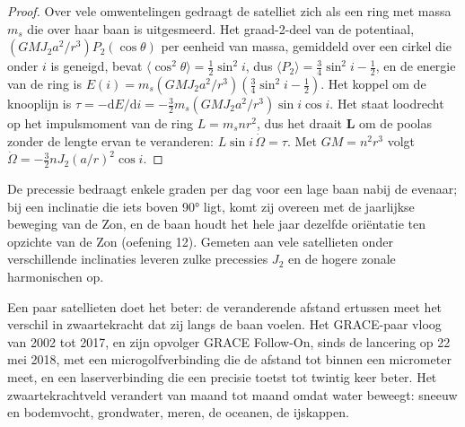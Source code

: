 \begin{proof}
Over vele omwentelingen gedraagt de satelliet zich als een ring met massa $m_s$ die
over haar baan is uitgesmeerd. Het graad-2-deel van de potentiaal,
$(GMJ_2a^2/r^3)P_2(\cos\theta)$ per eenheid van massa, gemiddeld over een cirkel die
onder $i$ is geneigd, bevat $\langle\cos^2\theta\rangle = \tfrac12\sin^2i$, dus
$\langle P_2\rangle = \tfrac34\sin^2i - \tfrac12$, en de energie van de ring is
$E(i) = m_s(GMJ_2a^2/r^3)(\tfrac34\sin^2i - \tfrac12)$. Het koppel om de knooplijn
is $\tau = -\mathrm dE/\mathrm di = -\tfrac32m_s(GMJ_2a^2/r^3)\sin
i\cos i$. Het staat loodrecht op het impulsmoment van de ring $L = m_snr^2$, dus
het draait $\mathbf L$ om de poolas zonder de lengte ervan te veranderen:
$L\sin i\,\dot\Omega = \tau$. Met $GM = n^2r^3$ volgt $\dot\Omega =
-\tfrac32nJ_2(a/r)^2\cos i$.
\end{proof}

De precessie bedraagt enkele graden per dag voor een lage baan nabij de evenaar; bij
een inclinatie die iets boven \ang{90} ligt, komt zij overeen met de jaarlijkse beweging van de Zon, en
de baan houdt het hele jaar dezelfde oriëntatie ten opzichte van de Zon (oefening 12). Gemeten aan
vele satellieten onder verschillende inclinaties leveren zulke precessies $J_2$ en de
hogere zonale harmonischen op.

Een paar satellieten doet het beter: de veranderende afstand ertussen meet
het verschil in zwaartekracht dat zij langs de baan voelen. Het GRACE-paar vloog van 2002 tot 2017, en zijn
opvolger GRACE Follow-On, sinds de lancering op 22 mei 2018, met een microgolfverbinding
die de afstand tot binnen een micrometer meet, en een laserverbinding die
een precisie toetst tot twintig keer beter.
Het zwaartekrachtveld verandert van maand tot maand omdat water beweegt: sneeuw en bodemvocht,
grondwater, meren, de oceanen, de ijskappen.

